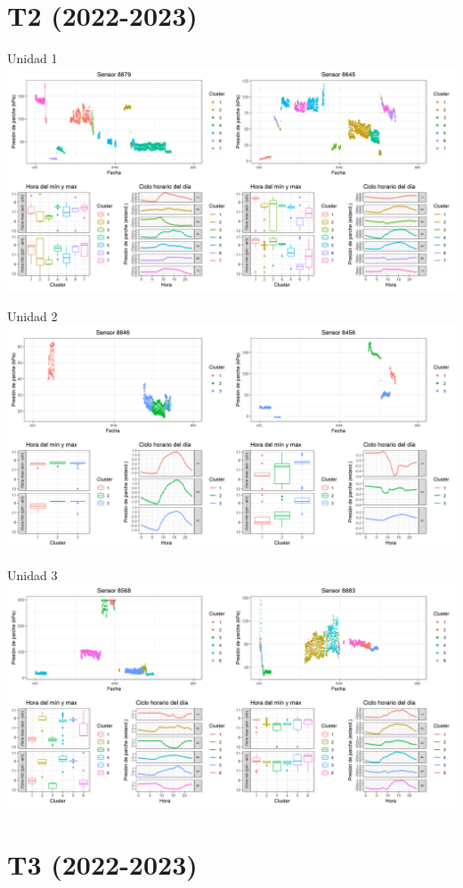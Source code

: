 \documentclass[
  letterpaper,
  DIV=11,
  numbers=noendperiod]{scrreprt}
\begin{document}
\chapter{T2 (2022-2023)}

Unidad 1
\includegraphics{figuras/01_turgor_sensor/2022_2023_Rio_Claro_T2_Unidad_1.png}

Unidad 2
\includegraphics{figuras/01_turgor_sensor/2022_2023_Rio_Claro_T2_Unidad_2.png}

Unidad 3
\includegraphics{figuras/01_turgor_sensor/2022_2023_Rio_Claro_T2_Unidad_3.png}

\chapter{T3 (2022-2023)}
\end{document}

